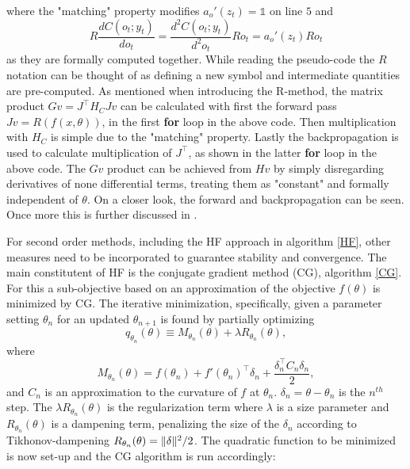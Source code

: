 \noindent
where the "matching" property modifies $a_o'(z_t) = \mathds{1}$ on line $5$ and \[R\frac{dC(o_t; y_t)}{d o_t} = \frac{d^2C(o_t; y_t)}{d^2o_t} Ro_t =  a_o'(z_t)  Ro_t\] as they are formally computed together. While reading the pseudo-code the $R$ notation can be thought of as defining a new symbol and intermediate quantities are pre-computed. As mentioned when introducing the R-method, the matrix product $Gv = J^\intercal H_C J v$ can be calculated with first the forward pass $Jv = R(f(x, \theta))$, in the first \textbf{for} loop in the above code. Then multiplication with $H_C$ is simple due to the "matching" property. Lastly the backpropagation is used to calculate multiplication of $J^\intercal$, as shown in the latter \textbf{for} loop in the above code. The $Gv$ product can be achieved from $Hv$ by simply disregarding derivatives of none differential terms, treating them as "constant" and formally independent of $\theta$. On a closer look, the forward and backpropagation can be seen. Once more this is further discussed in \cite{suts}.

For second order methods, including the HF approach in algorithm \ref{HF}, other measures need to be incorporated to guarantee stability and convergence. The main constitutent of HF is the conjugate gradient method (CG), algorithm \ref{CG}. For this a sub-objective based on an approximation of the objective $f(\theta)$ is minimized by CG. The iterative minimization, specifically, given a parameter setting $\theta_n$ for an updated $\theta_{n+1}$ is found by partially optimizing \[q_{\theta_n} (\theta) \equiv M_{\theta_n}(\theta) + \lambda R_{\theta_n}(\theta),\] where \[M_{\theta_n}(\theta) = f(\theta_n) + f'(\theta_n)^\intercal \delta_n + \frac{\delta_n^\intercal C_n \delta_n}{2},\] and $C_n$ is an approximation to the curvature of $f$ at $\theta_n$. $\delta_n = \theta - \theta_n$ is the $n^{th}$ step. The $\lambda R_{\theta_n}(\theta)$ is the regularization term where $\lambda$ is a size parameter and $R_{\theta_n}(\theta)$ is a dampening term, penalizing the size of the $\delta_n$ according to Tikhonov-dampening $R_{\theta_n}(\theta) = \lVert\delta\rVert^2/2$. The quadratic function to be minimized is now set-up and the CG algorithm is run accordingly:


